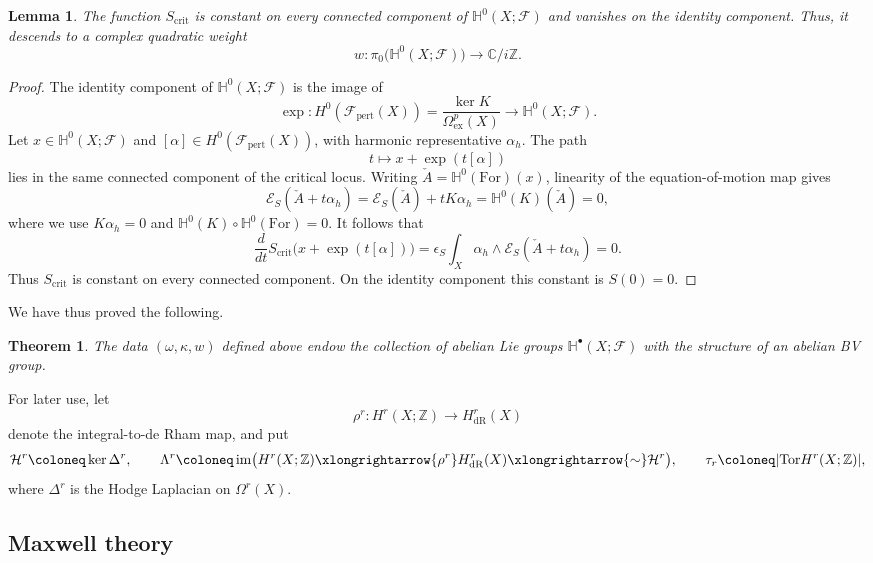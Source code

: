 \documentclass[12pt]{amsart}
\numberwithin{table}{section}
\numberwithin{equation}{section}
\newtheorem{lem}{Lemma}[section]
\newtheorem{thm}{Theorem}[section]
\theoremstyle{plain}
\newcommand{\sE}{\mathcal{E}}
\newcommand{\sF}{\mathcal{F}}
\newcommand{\sH}{\mathcal{H}}
\newcommand{\C}{\mathbb{C}}
\newcommand{\Z}{\mathbb{Z}}
\newcommand{\Tor}{\mathrm{Tor}}
\begin{document}
\begin{lem}
	The function $S_{\mathrm{crit}}$ is constant on every connected component of $\mathbb H^0(X;\sF)$ and vanishes on the identity component. Thus, it descends to a complex quadratic weight
	\[
	w \colon \pi_0 \bigl(\mathbb H^0(X;\sF)\bigr)
	\longrightarrow \C/i\Z.
	\]
\end{lem}

\begin{proof}
	The identity component of $\mathbb H^0(X;\sF)$ is the image of
	\[
	\exp\colon
	H^0(\sF_{\mathrm{pert}}(X))
	=
	\frac{\ker K}{\Omega_{\mathrm{ex}}^p(X)}
	\longrightarrow
	\mathbb H^0(X;\sF).
	\]
	Let $x\in\mathbb H^0(X;\sF)$ and $[\alpha]\in H^0(\sF_{\mathrm{pert}}(X))$, with harmonic representative $\alpha_h$. The path
	\[
	t\longmapsto x+\exp(t[\alpha])
	\]
	lies in the same connected component of the critical locus. Writing $\check A=\mathbb H^0(\mathrm{For})(x)$, linearity of the equation-of-motion map gives
	\[
	\sE_S(\check A+t\alpha_h)=\sE_S(\check A)+tK\alpha_h = \mathbb H^0(K)(\check A) = 0,
	\]
	where we use $K \alpha_h = 0$ and $\mathbb H^0(K) \circ\mathbb H^0(\mathrm{For}) = 0$. It follows that
	\[
	\frac{d}{dt}S_{\mathrm{crit}}\bigl(x+\exp(t[\alpha])\bigr)
	=\epsilon_S\int_X\alpha_h\wedge\sE_S(\check A+t\alpha_h) = 0.
	\]
	Thus $S_{\mathrm{crit}}$ is constant on every connected component. On the identity component this constant is $S(0)=0$.
\end{proof}


We have thus proved the following.

\begin{thm}
	The data $(\omega,\kappa,w)$ defined above endow the collection of abelian Lie groups $\mathbb H^\bullet(X;\sF)$ with the structure of an abelian BV group.
\end{thm}

For later use, let
\[
\rho^r:H^r(X;\Z)\longrightarrow H^r_{\mathrm{dR}}(X)
\]
denote the integral-to-de Rham map, and put
\[
\sH^r \coloneq \ker \Delta^r,
\qquad
\Lambda^r \coloneq \operatorname{im}\bigl(H^r(X;\Z)\xlongrightarrow{\rho^r} H^r_{\mathrm{dR}}(X) \xlongrightarrow{\sim} \sH^r\bigr),
\qquad
\tau_r\coloneq|\Tor H^r(X;\Z)|,
\]
where $\Delta^r$ is the Hodge Laplacian on $\Omega^r(X)$. 

\subsection{Maxwell theory}
\end{document}
